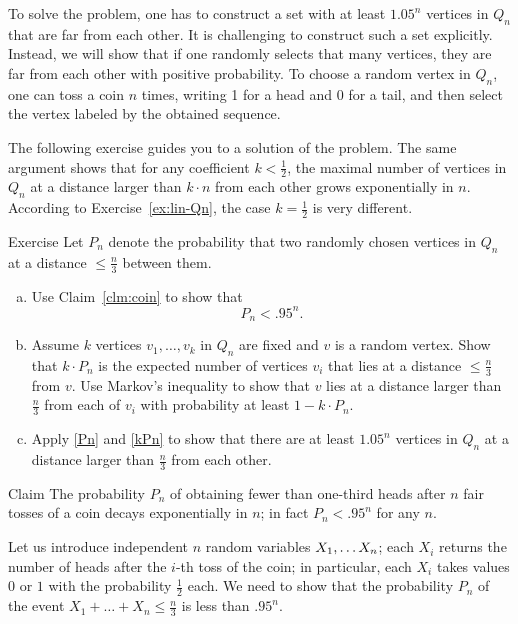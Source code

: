 To solve the problem, one has to construct a set with at least $1.05^n$ vertices in $Q_n$ that are far from each other.
It is challenging to construct such a set explicitly.
Instead, we will show that 
if one randomly selects that many vertices, they are far from each other with positive probability.
To choose a random vertex in $Q_n$, one can toss a coin $n$ times, writing 1 for a head and 0 for a tail, and then select the vertex labeled by the obtained sequence.

The following exercise guides you to a solution of the problem.
The same argument shows that for any coefficient $k<\tfrac12$, the maximal number of vertices in $Q_n$ at a distance larger than $k\cdot n$ from each other grows exponentially in $n$.
According to Exercise~\ref{ex:lin-Qn}, the case $k= \tfrac12$ is very different.

\begin{thm}{Exercise}\label{ex:Qn-dist}
Let $P_n$ denote the probability that two randomly chosen vertices in $Q_n$ at a distance $\le\tfrac n3$ between them.
\begin{enumerate}[(a)]

\item\label{Pn} Use Claim~\ref{clm:coin} to show that 
\[P_n<.95^n.\]

\item\label{kPn} Assume $k$ vertices  $v_1,\dots ,v_k$ in $Q_n$ are fixed and $v$ is a random vertex.
Show that $k\cdot P_n$ is the expected number of vertices $v_i$ that lies at a distance $\le\tfrac n3$ from $v$.
Use Markov's inequality to show that $v$ lies at a distance larger than $\tfrac n3$ from each of $v_i$ with probability at least $1-k\cdot P_n$.

\item\label{ex:Qn-dist:end} Apply \ref{Pn} and \ref{kPn} to show that there are at least $1.05^n$ vertices in $Q_n$ at a distance larger than $\tfrac n3$ from each other.
\end{enumerate}
\end{thm}


\begin{thm}{Claim}\label{clm:coin}
The probability $P_n$ of obtaining fewer than one-third heads after $n$ fair tosses of a coin decays exponentially in $n$;
in fact $P_n<.95^n$ for any $n$.
\end{thm}

Let us introduce independent $n$ random variables $X_1,\dots X_n$;
each $X_i$ returns the number of heads after the $i$-th toss of the coin;
in particular, each $X_i$ takes values $0$ or $1$ with the probability $\tfrac12$ each.
We need to show that the probability $P_n$ of the event $X_1+\dots+X_n\le\tfrac n3$ is less than 
$.95^n$.

